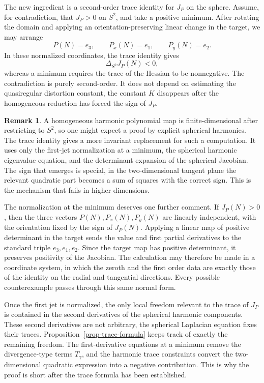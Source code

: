 \documentclass[10pt]{amsart}
\numberwithin{equation}{section}
\theoremstyle{definition}
\newtheorem{remark}{Remark}[section]
\begin{document}
The new ingredient is a second-order trace identity for \(J_P\) on the sphere.
Assume, for contradiction, that \(J_P>0\) on \(S^2\), and take a positive
minimum. After rotating the domain and applying an orientation-preserving
linear change in the target, we may arrange
\[
        P(N)=e_3,
        \qquad
        P_x(N)=e_1,
        \qquad
        P_y(N)=e_2 .
\]
In these normalized coordinates, the trace identity gives
\[
        \Delta_{S^2}J_P(N)<0,
\]
whereas a minimum requires the trace of the Hessian to be nonnegative. The
contradiction is purely second-order. It does not depend on estimating the
quasiregular distortion constant, the constant \(K\) disappears after the
homogeneous reduction has forced the sign of \(J_P\).

\begin{remark}
A homogeneous harmonic polynomial map is finite-dimensional after restricting
to \(S^2\), so one might expect a proof by explicit spherical harmonics. The
trace identity gives a more invariant replacement for such a computation. It
uses only the first-jet normalization at a minimum, the spherical harmonic
eigenvalue equation, and the determinant expansion of the spherical Jacobian.
The sign that emerges is special, in the two-dimensional tangent plane the
relevant quadratic part becomes a sum of squares with the correct sign. This is
the mechanism that fails in higher dimensions.
\end{remark}

The normalization at the minimum deserves one further comment. If
\(J_P(N)>0\), then the three vectors \(P(N),P_x(N),P_y(N)\) are linearly
independent, with the orientation fixed by the sign of \(J_P(N)\). Applying a
linear map of positive determinant in the target sends the value and first
partial derivatives to the standard triple \(e_3,e_1,e_2\). Since the target
map has positive determinant, it preserves positivity of the Jacobian. The
calculation may therefore be made in a coordinate system, in which the zeroth
and the first order data are exactly those of the identity on the radial and
tangential directions. Every possible counterexample passes through this same
normal form.

Once the first jet is normalized, the only local freedom relevant to the trace
of \(J_P\) is contained in the second derivatives of the spherical harmonic
components. These second derivatives are not arbitrary, the spherical
Laplacian equation fixes their traces. Proposition~\ref{prop-trace-formula}
keeps track of exactly the remaining freedom. The first-derivative equations
at a minimum remove the divergence-type terms \(T_\gamma\), and the harmonic
trace constraints convert the two-dimensional quadratic expression into a
negative contribution. This is why the proof is short after the trace formula
has been established.
\end{document}
